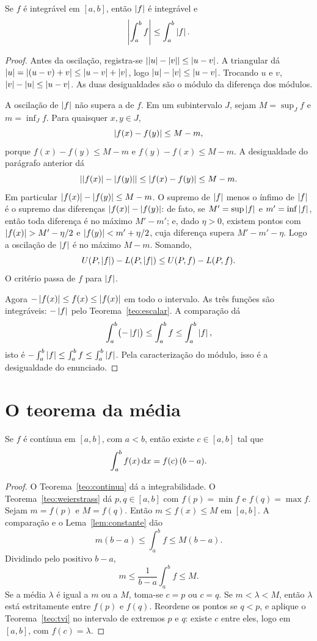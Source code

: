 \documentclass[11pt,a4paper]{article}
\begin{document}
\begin{teorema}\label{teo:modulo}
Se $f$ é integrável em $[a,b]$, então $\left\lvert f \right\rvert$ é integrável e
\[
\left\lvert \int_a^b f \right\rvert\le\int_a^b\left\lvert f \right\rvert.
\]
\end{teorema}

\begin{proof}
Antes da oscilação, registra-se $\left\lvert \left\lvert u \right\rvert-\left\lvert v \right\rvert \right\rvert\le\left\lvert u-v \right\rvert$. A triangular dá $\left\lvert u \right\rvert=\left\lvert (u-v)+v \right\rvert\le\left\lvert u-v \right\rvert+\left\lvert v \right\rvert$, logo $\left\lvert u \right\rvert-\left\lvert v \right\rvert\le\left\lvert u-v \right\rvert$. Trocando $u$ e $v$, $\left\lvert v \right\rvert-\left\lvert u \right\rvert\le\left\lvert u-v \right\rvert$. As duas desigualdades são o módulo da diferença dos módulos.

A oscilação de $\left\lvert f \right\rvert$ não supera a de $f$. Em um subintervalo $J$, sejam $M=\sup_J f$ e $m=\inf_J f$. Para quaisquer $x,y\in J$,
\[
\left\lvert f(x)-f(y) \right\rvert\le M-m,
\]
porque $f(x)-f(y)\le M-m$ e $f(y)-f(x)\le M-m$. A desigualdade do parágrafo anterior dá
\[
\left\lvert \left\lvert f(x) \right\rvert-\left\lvert f(y) \right\rvert \right\rvert\le\left\lvert f(x)-f(y) \right\rvert\le M-m.
\]
Em particular $\left\lvert f(x) \right\rvert-\left\lvert f(y) \right\rvert\le M-m$. O supremo de $\left\lvert f \right\rvert$ menos o ínfimo de $\left\lvert f \right\rvert$ é o supremo das diferenças $\left\lvert f(x) \right\rvert-\left\lvert f(y) \right\rvert$: de fato, se $M'=\sup\left\lvert f \right\rvert$ e $m'=\inf\left\lvert f \right\rvert$, então toda diferença é no máximo $M'-m'$; e, dado $\eta>0$, existem pontos com $\left\lvert f(x) \right\rvert>M'-\eta/2$ e $\left\lvert f(y) \right\rvert<m'+\eta/2$, cuja diferença supera $M'-m'-\eta$. Logo a oscilação de $\left\lvert f \right\rvert$ é no máximo $M-m$. Somando,
\[
U(P,\left\lvert f \right\rvert)-L(P,\left\lvert f \right\rvert)\le U(P,f)-L(P,f).
\]
O critério passa de $f$ para $\left\lvert f \right\rvert$.

Agora $-\left\lvert f(x) \right\rvert\le f(x)\le\left\lvert f(x) \right\rvert$ em todo o intervalo. As três funções são integráveis: $-\left\lvert f \right\rvert$ pelo Teorema~\ref{teo:escalar}. A comparação dá
\[
\int_a^b\bigl(-\left\lvert f \right\rvert\bigr)\le\int_a^b f\le\int_a^b\left\lvert f \right\rvert,
\]
isto é $-\int_a^b\left\lvert f \right\rvert\le\int_a^b f\le\int_a^b\left\lvert f \right\rvert$. Pela caracterização do módulo, isso é a desigualdade do enunciado.
\end{proof}

\section{O teorema da média}

\begin{teorema}\label{teo:media}
Se $f$ é contínua em $[a,b]$, com $a<b$, então existe $c\in[a,b]$ tal que
\[
\int_a^b f(x)\,\mathrm{d} x=f(c)\,(b-a).
\]
\end{teorema}

\begin{proof}
O Teorema~\ref{teo:continua} dá a integrabilidade. O Teorema~\ref{teo:weierstrass} dá $p,q\in[a,b]$ com $f(p)=\min f$ e $f(q)=\max f$. Sejam $m=f(p)$ e $M=f(q)$. Então $m\le f(x)\le M$ em $[a,b]$. A comparação e o Lema~\ref{lem:constante} dão
\[
m(b-a)\le\int_a^b f\le M(b-a).
\]
Dividindo pelo positivo $b-a$,
\[
m\le\frac{1}{b-a}\int_a^b f\le M.
\]
Se a média $\lambda$ é igual a $m$ ou a $M$, toma-se $c=p$ ou $c=q$. Se $m<\lambda<M$, então $\lambda$ está estritamente entre $f(p)$ e $f(q)$. Reordene os pontos se $q<p$, e aplique o Teorema~\ref{teo:tvi} no intervalo de extremos $p$ e $q$: existe $c$ entre eles, logo em $[a,b]$, com $f(c)=\lambda$.
\end{proof}
\end{document}
